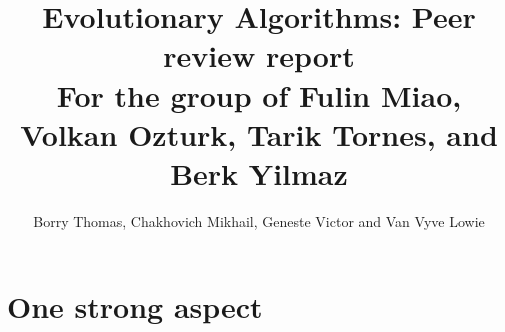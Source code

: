 \documentclass[a4paper,10pt]{article}
\title{\vspace{-2cm}Evolutionary Algorithms: Peer review report\\ {\large For the group of Fulin Miao, Volkan Ozturk, Tarik Tornes, and Berk Yilmaz}}
\author{Borry Thomas, Chakhovich Mikhail, Geneste Victor and Van Vyve Lowie}
\newcommand{\thisyear}{\the\year}
\newcommand{\deadlinePeer}{November 17, \thisyear{} at 9:00 CET}
\newcommand{\ReplaceMe}[1]{{\color{blue}#1}}
\newcommand{\RemoveMe}[1]{{\color{purple}#1}}
\begin{document}
\selectfont{}

\maketitle






\section{One strong aspect}

\end{document}
